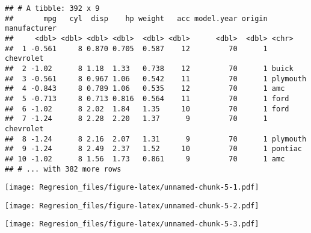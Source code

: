\documentclass[]{article}
\newenvironment{Shaded}{\begin{snugshade}}{\end{snugshade}}
\newcommand{\KeywordTok}[1]{\textcolor[rgb]{0.13,0.29,0.53}{\textbf{{#1}}}}
\newcommand{\NormalTok}[1]{{#1}}
\begin{document}
\begin{verbatim}
## # A tibble: 392 x 9
##       mpg   cyl  disp    hp weight   acc model.year origin manufacturer
##     <dbl> <dbl> <dbl> <dbl>  <dbl> <dbl>      <dbl>  <dbl> <chr>       
##  1 -0.561     8 0.870 0.705  0.587    12         70      1 chevrolet   
##  2 -1.02      8 1.18  1.33   0.738    12         70      1 buick       
##  3 -0.561     8 0.967 1.06   0.542    11         70      1 plymouth    
##  4 -0.843     8 0.789 1.06   0.535    12         70      1 amc         
##  5 -0.713     8 0.713 0.816  0.564    11         70      1 ford        
##  6 -1.02      8 2.02  1.84   1.35     10         70      1 ford        
##  7 -1.24      8 2.28  2.20   1.37      9         70      1 chevrolet   
##  8 -1.24      8 2.16  2.07   1.31      9         70      1 plymouth    
##  9 -1.24      8 2.49  2.37   1.52     10         70      1 pontiac     
## 10 -1.02      8 1.56  1.73   0.861     9         70      1 amc         
## # ... with 382 more rows
\end{verbatim}

\begin{Shaded}
\end{Shaded}

\texttt{[image: Regresion\_files/figure-latex/unnamed-chunk-5-1.pdf]}

\begin{Shaded}
\end{Shaded}

\texttt{[image: Regresion\_files/figure-latex/unnamed-chunk-5-2.pdf]}

\begin{Shaded}
\end{Shaded}

\texttt{[image: Regresion\_files/figure-latex/unnamed-chunk-5-3.pdf]}

\begin{Shaded}
\end{Shaded}
\end{document}
